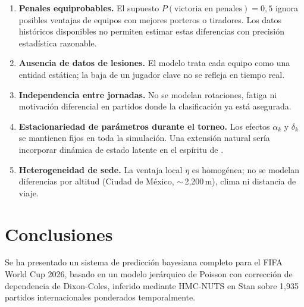 \documentclass[12pt,a4paper]{article}
\begin{document}
\begin{enumerate}
  \item \textbf{Penales equiprobables.}
        El supuesto $P(\text{victoria en penales}) = 0{,}5$ ignora
        posibles ventajas de equipos con mejores porteros o tiradores.
        Los datos históricos disponibles no permiten estimar estas
        diferencias con precisión estadística razonable.

  \item \textbf{Ausencia de datos de lesiones.}
        El modelo trata cada equipo como una entidad estática; la baja de
        un jugador clave no se refleja en tiempo real.

  \item \textbf{Independencia entre jornadas.}
        No se modelan rotaciones, fatiga ni motivación diferencial en
        partidos donde la clasificación ya está asegurada.

  \item \textbf{Estacionariedad de parámetros durante el torneo.}
        Los efectos $\alpha_k$ y $\delta_k$ se mantienen fijos en toda la
        simulación. Una extensión natural sería incorporar dinámica de estado
        latente en el espíritu de \citet{rue2000prediction}.

  \item \textbf{Heterogeneidad de sede.}
        La ventaja local $\eta$ es homogénea; no se modelan diferencias por
        altitud (Ciudad de México, $\sim$\,2{,}200\,m), clima ni distancia
        de viaje.
\end{enumerate}

\section{Conclusiones}
\label{sec:conclusion}

Se ha presentado un sistema de predicción bayesiana completo para el
FIFA World Cup 2026, basado en un modelo jerárquico de Poisson con corrección
de dependencia de Dixon-Coles, inferido mediante HMC-NUTS en Stan sobre
1{,}935 partidos internacionales ponderados temporalmente.
\end{document}
